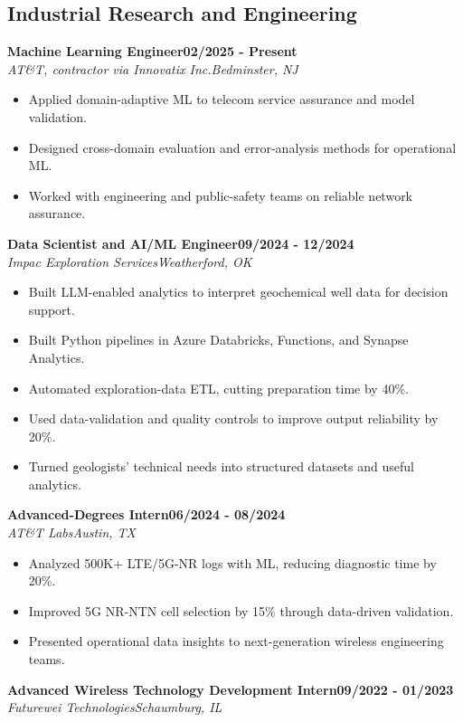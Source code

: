 \documentclass[8pt,letterpaper]{extarticle}
\newcommand{\role}[4]{%
  \Needspace{4\baselineskip}\textbf{#1}\hfill\textbf{#2}\\[-1pt]
  \textit{#3}\hfill\textit{#4}\par}
\begin{document}
\subsection{Industrial Research and Engineering}
\role{Machine Learning Engineer}{02/2025 - Present}{AT\&T, contractor via Innovatix Inc.}{Bedminster, NJ}
\begin{itemize}
\item Applied domain-adaptive ML to telecom service assurance and model validation.
\item Designed cross-domain evaluation and error-analysis methods for operational ML.
\item Worked with engineering and public-safety teams on reliable network assurance.
\end{itemize}
\vspace{1pt}
\role{Data Scientist and AI/ML Engineer}{09/2024 - 12/2024}{Impac Exploration Services}{Weatherford, OK}
\begin{itemize}
\item Built LLM-enabled analytics to interpret geochemical well data for decision support.
\item Built Python pipelines in Azure Databricks, Functions, and Synapse Analytics.
\item Automated exploration-data ETL, cutting preparation time by 40\%.
\item Used data-validation and quality controls to improve output reliability by 20\%.
\item Turned geologists' technical needs into structured datasets and useful analytics.
\end{itemize}
\vspace{1pt}
\role{Advanced-Degrees Intern}{06/2024 - 08/2024}{AT\&T Labs}{Austin, TX}
\begin{itemize}
\item Analyzed 500K+ LTE/5G-NR logs with ML, reducing diagnostic time by 20\%.
\item Improved 5G NR-NTN cell selection by 15\% through data-driven validation.
\item Presented operational data insights to next-generation wireless engineering teams.
\end{itemize}
\vspace{1pt}
\role{Advanced Wireless Technology Development Intern}{09/2022 - 01/2023}{Futurewei Technologies}{Schaumburg, IL}
\end{document}
